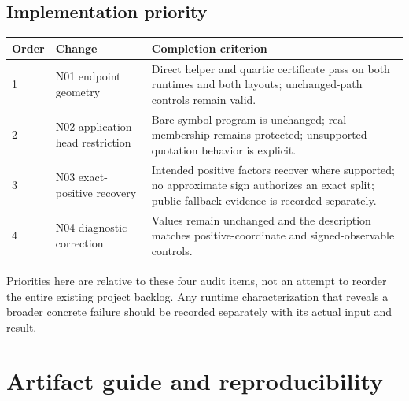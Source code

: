 \documentclass[11pt,letterpaper]{article}
\begin{document}
\subsection{Implementation priority}

\begin{tabularx}{\textwidth}{@{}P{0.65in}P{1.7in}Y@{}}
\toprule
Order & Change & Completion criterion\\ & N01 endpoint geometry & Direct helper and quartic certificate pass on both runtimes and both layouts; unchanged-path controls remain valid.\\[5pt]
2 & N02 application-head restriction & Bare-symbol program is unchanged; real membership remains protected; unsupported quotation behavior is explicit.\\[5pt]
3 & N03 exact-positive recovery & Intended positive factors recover where supported; no approximate sign authorizes an exact split; public fallback evidence is recorded separately.\\[5pt]
4 & N04 diagnostic correction & Values remain unchanged and the description matches positive-coordinate and signed-observable controls.\\
\bottomrule
\end{tabularx}

Priorities here are relative to these four audit items, not an attempt to reorder the entire existing project backlog. Any runtime characterization that reveals a broader concrete failure should be recorded separately with its actual input and result.

\section{Artifact guide and reproducibility}
\end{document}
